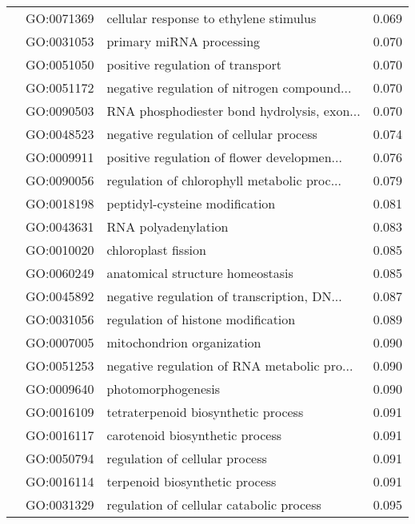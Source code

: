 \begin{longtable}{lllr}
   & GO:0071369 &       cellular response to ethylene stimulus &         0.069 \\
   & GO:0031053 &                     primary miRNA processing &         0.070 \\
   & GO:0051050 &             positive regulation of transport &         0.070 \\
   & GO:0051172 &  negative regulation of nitrogen compound... &         0.070 \\
   & GO:0090503 &  RNA phosphodiester bond hydrolysis, exon... &         0.070 \\
   & GO:0048523 &      negative regulation of cellular process &         0.074 \\
   & GO:0009911 &  positive regulation of flower developmen... &         0.076 \\
   & GO:0090056 &  regulation of chlorophyll metabolic proc... &         0.079 \\
   & GO:0018198 &               peptidyl-cysteine modification &         0.081 \\
   & GO:0043631 &                          RNA polyadenylation &         0.083 \\
   & GO:0010020 &                          chloroplast fission &         0.085 \\
   & GO:0060249 &             anatomical structure homeostasis &         0.085 \\
   & GO:0045892 &  negative regulation of transcription, DN... &         0.087 \\
   & GO:0031056 &           regulation of histone modification &         0.089 \\
   & GO:0007005 &                   mitochondrion organization &         0.090 \\
   & GO:0051253 &  negative regulation of RNA metabolic pro... &         0.090 \\
   & GO:0009640 &                           photomorphogenesis &         0.090 \\
   & GO:0016109 &          tetraterpenoid biosynthetic process &         0.091 \\
   & GO:0016117 &              carotenoid biosynthetic process &         0.091 \\
   & GO:0050794 &               regulation of cellular process &         0.091 \\
   & GO:0016114 &               terpenoid biosynthetic process &         0.091 \\
   & GO:0031329 &     regulation of cellular catabolic process &         0.095 \\

\end{longtable}
